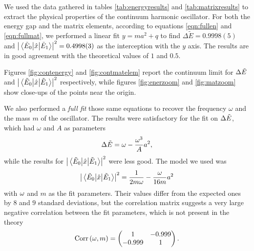 We used the data gathered in tables \ref{tab:energyresults} and \ref{tab:matrixresults} to extract the physical properties of the continuum harmonic oscillator.
For both the energy gap and the matrix elements, according to equations \ref{eqn:fullen} and \ref{eqn:fullmat}, we performed a linear fit $y = m a ^2+q$ to find
$\Delta\tilde{E} = 0.9998(5)$ and $\abs{\mel{\tilde{E}_0}{\hat{x}}{\tilde{E}_1}} ^2 = 0.4998(3)$ as the interception with the $y$ axis. The results are in good agreement with the theoretical values of $1$ and $0.5$.

Figures \ref{fig:contenergy} and \ref{fig:contmatelem} report the continuum limit for $\Delta \tilde{E}$ and $\abs{\mel{\tilde{E}_0}{\hat{x}}{\tilde{E}_1}} ^2$ respectively, while figures \ref{fig:enerzoom} and \ref{fig:matzoom}
show close-ups of the points near the origin.

We also performed a \textit{full fit} those same equations to recover the frequency $\omega$ and the mass $m$ of the oscillator.
The results were satisfactory for the fit on $\Delta \tilde{E}$, which had $\omega$ and $A$ as parameters
\begin{align}
  \Delta \tilde{E} = \omega - \frac{\omega^{3}}{A}a^{2},
\end{align}
while the results for $\abs{\mel{\tilde{E}_0}{\hat{x}}{\tilde{E}_1}} ^2$ were less good. The model we used was
\begin{align}
  \abs{\mel{\tilde{E}_0}{\hat{x}}{\tilde{E}_1}} ^2 = \frac{1}{2m\omega}- \frac{\omega}{16 m}a^{2}
\end{align}
with $\omega$ and $m$ as the fit parameters. Their values differ
from the expected ones by $8$ and $9$ standard deviations, but the correlation matrix suggests a very large negative correlation
between the fit parameters, which is not present in the theory
\begin{align}
  \label{eqn:cov}
  \operatorname{Corr}\qty(\omega,m) =
  \begin{pmatrix}
    1 & -0.999\\
    -0.999 & 1\\
  \end{pmatrix}.
\end{align}


